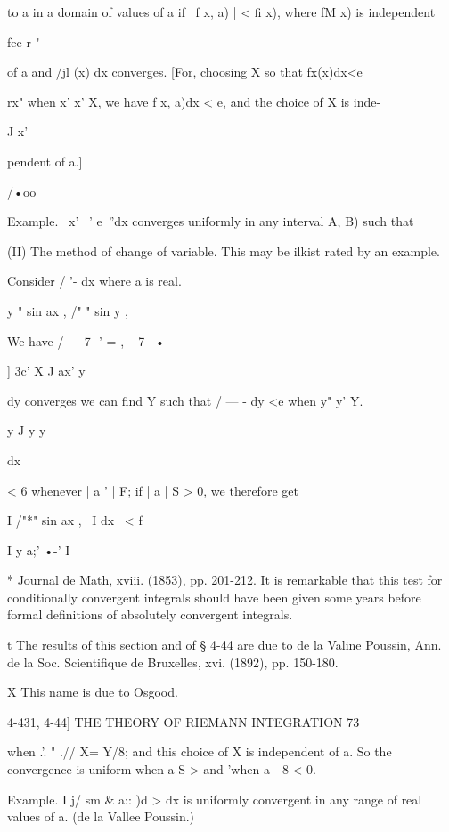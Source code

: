 to a in a domain of values of a if \ f x, a) | < fi x), where fM x) is
independent

fee r "

of a and /jl (x) dx converges. [For, choosing X so that fx(x)dx<e

rx" when x' x' X, we have f x, a)dx < e, and the choice of X is inde-

J x'

pendent of a.]

/•oo

Example. \ x' ~' e~''dx converges uniformly in any interval A, B) such
that

(II) The method of change of variable. This may be ilkist rated by an
example.

Consider / '- dx where a is real.

y " sin ax , /" " sin y ,

We have / — 7- ' = , ~ 7~ •

] 3c' X J ax' y

   dy converges we can find Y such that / — - dy <e when y" y' Y.

y J y y






dx



< 6 whenever | a ' | F; if | a | S > 0, we therefore get

I /"*" sin ax , \ I dx \ < f

I y a;' •-' I



* Journal de Math, xviii. (1853), pp. 201-212. It is remarkable that
this test for conditionally convergent integrals should have been
given some years before formal definitions of absolutely convergent
integrals.

t The results of this section and of § 4-44 are due to de la Valine
Poussin, Ann. de la Soc. Scientifique de Bruxelles, xvi. (1892), pp.
150-180.

X This name is due to Osgood.



4-431, 4-44] THE THEORY OF RIEMANN INTEGRATION 73

when .'. " .// X= Y/8; and this choice of X is independent of a. So
the convergence is uniform when a S > and 'when a - 8 < 0.

Example. I j/ sm \& a:: )d > dx is uniformly convergent in any range
of real values of a. (de la Vallee Poussin.)

